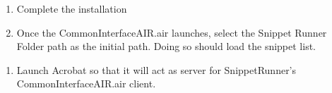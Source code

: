 \documentclass[letterpaper,12pt,english,openany,oneside]{sphinxmanual}
\begin{document}
\noindent{}
\begin{enumerate}
%
\item {} 
Complete the installation

\item {} 
Once the CommonInterfaceAIR.air launches, select the Snippet Runner Folder path as the initial path. Doing so should load the snippet list.

\end{enumerate}

\noindent{}
\begin{enumerate}
%
\item {} 
Launch Acrobat so that it will act as server for SnippetRunner’s CommonInterfaceAIR.air client.

\end{enumerate}
\end{document}
